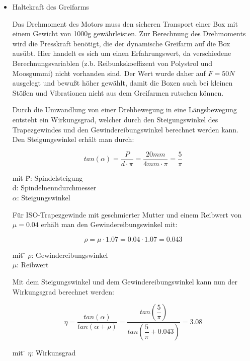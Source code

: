 \begin{itemize}

\item Haltekraft des Greifarms

Das Drehmoment des Motors muss den sicheren Transport einer Box mit einem Gewicht von 1000g gewährleisten. Zur Berechnung des Drehmoments wird die Presskraft benötigt, die der dynamische Greifarm auf die Box ausübt. Hier handelt es sich um einen Erfahrungswert, da verschiedene Berechnungsvariablen (z.b. Reibunkskoeffizent von Polystrol und Moosgummi) nicht vorhanden sind. Der Wert wurde daher auf $F=50N$ ausgelegt und bewußt höher gewählt, damit die Boxen auch bei kleinen Stößen und Vibrationen nicht aus dem Greifarmen rutschen können.\\
\newline

Durch die Umwandlung von einer Drehbewegung in eine Längsbewegung entsteht ein Wirkungsgrad, welcher durch den 
Steigungswinkel des Trapezgewindes und den Gewindereibungswinkel berechnet werden kann.\\

Den Steigungswinkel erhält man durch:

\[tan(\alpha)=\dfrac{P}{d\cdot \pi}=\dfrac{20mm}{4mm\cdot \pi}=\dfrac{5}{\pi}\]

\begin{tabbing}
mit \= P: Spindelsteigung\\
    \> d: Spindelnenndurchmesser  \\
		\> $\alpha$: Steigungswinkel\\
\end{tabbing}

Für ISO-Trapezgewinde mit geschmierter Mutter und einem Reibwert von $\mu=0.04$ erhält man den Gewindereibungswinkel mit:

\[ \rho=\mu\cdot 1.07= 0.04\cdot 1.07=0.043 \]

\begin{tabbing}
mit \= $\rho$: Gewindereibungswinkel\\
    \> $\mu$: Reibwert  \\
\end{tabbing}

Mit dem Steigungswinkel und dem Gewindereibungswinkel kann nun der Wirkungsgrad berechnet werden:

\[\eta=\dfrac{tan(\alpha)}{tan(\alpha +\rho)}=\dfrac{tan(\dfrac{5}{\pi})}{tan(\dfrac{5}{\pi}+0.043)}=3.08\]

\begin{tabbing}
mit \= $\eta$: Wirkunsgrad \\
\end{tabbing}


\end{itemize}
